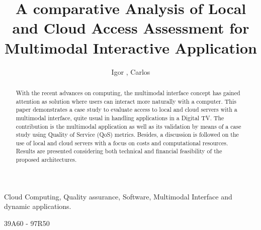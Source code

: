 \documentclass{cai}
\begin{document}
\label{firstpage}

\title[How to Write a Paper for CAI]
      {A comparative Analysis of Local \\and Cloud Access Assessment for Multimodal Interactive Application}

\author[I.~Ja\v{s}\v{s}ov\'a, M.~Tak\'a\v{c}]
       {Igor , Carlos }




%
%

\noreceived{} \nocommunicated{}

\maketitle

\begin{abstract}
With the recent advances on computing, the multimodal interface concept has gained attention as solution where users can interact more naturally with a computer. This paper demonstrates a case study to evaluate access to local and cloud servers with a multimodal interface, quite usual in handling applications in a Digital TV. The contribution is the multimodal application as well as its validation by means of a case study using Quality of Service (QoS) metrics. Besides, a discussion is followed on the use of local and cloud servers with a focus on costs and computational resources. Results are presented considering both technical and financial feasibility of the proposed architectures.  
\end{abstract}

\begin{keywords}
Cloud Computing, Quality assurance, Software, Multimodal Interface and dynamic applications.
\end{keywords}

\begin{mathclass}
39A60 - 97R50
\end{mathclass}
\end{document}

